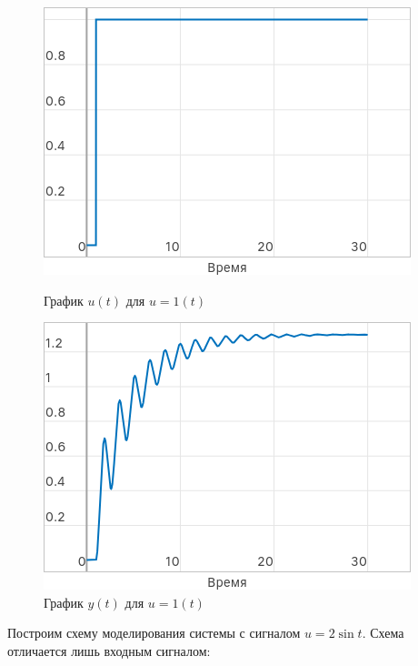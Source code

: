 \documentclass[a4paper]{article}
\begin{document}
\begin{figure}[H]
    \centering
    \begin{minipage}{0.4\textwidth}
        \includegraphics[width=\textwidth]{sources/task2_1t_u.png}
        \caption*{График $u(t)$ для $u=1(t)$}
    \end{minipage}
    \hspace{2em}
    \begin{minipage}{0.4\textwidth}
        \includegraphics[width=\textwidth]{sources/task2_1t_y.png}
        \caption*{График $y(t)$ для $u=1(t)$}
    \end{minipage}
\end{figure}
Построим схему моделирования системы с сигналом $u=2\sin{t}$. Схема отличается лишь входным сигналом:
\end{document}
